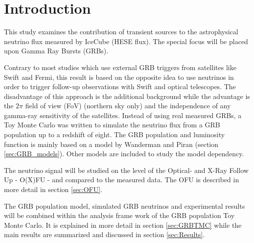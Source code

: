 \section{Introduction}
This study examines the contribution of transient sources to the astrophysical
neutrino flux measured by IceCube (HESE flux). The special focus will be
placed upon Gamma Ray Bursts (GRBs). 

Contrary to most studies which use external GRB triggers from satellites like
Swift and Fermi, this result is based on the opposite idea to use neutrinos in 
order to trigger follow-up observations with Swift and optical telescopes. The
disadvantage of this approach is the additional background while the advantage
is the $2\pi$ field of view (FoV) (northern sky only) and the independence of 
any
gamma-ray sensitivity of the satellites.
Instead of using real measured GRBs, a Toy Monte Carlo was written to simulate
the neutrino flux from a GRB population up to a redshift of eight. The GRB
population and luminosity function is mainly based on a model by Wanderman and
Piran (section \ref{sec:GRB_models}). Other models are included to study the
model dependency.

The neutrino signal will be studied on the level of the Optical- and X-Ray
Follow Up - O(X)FU - and compared to the measured data. The OFU is described
in more detail in section \ref{sec:OFU}. 

The GRB population model, simulated GRB neutrinos and experimental results will
be combined within the analysis frame work of the GRB population Toy Monte
Carlo. It is explained in more detail in section \ref{sec:GRBTMC} while the main
results are summarized and discussed in section \ref{sec:Results}.